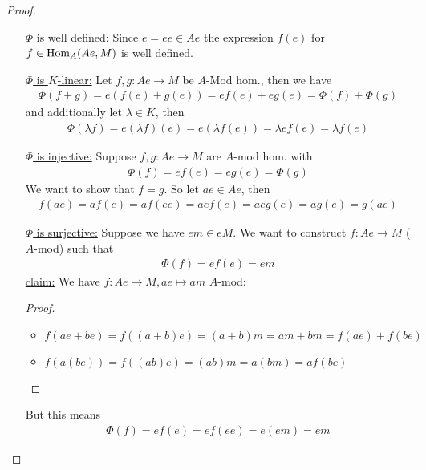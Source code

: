 \documentclass[]{article}
\begin{document}
\begin{proof}
\begin{enumerate}
\begin{itemize}
            \item[\underline{\(\Phi\) is well defined:}] Since \(e = ee \in Ae\) the expression \(f(e)\) for \(f \in \operatorname{Hom}_A(Ae,M)\) is well defined.
            \item[\underline{\(\Phi\) is \(K\)-linear:}] Let \(f,g:Ae \rightarrow M\) be \(A\)-Mod hom., then we have
                \begin{align*}
                    \Phi(f+g)=e(f(e)+g(e))=ef(e)+eg(e) = \Phi(f) + \Phi(g)
                \end{align*}
            and additionally let \(\lambda \in K\), then
            \begin{align*}
                \Phi(\lambda f) = e(\lambda f)(e) = e (\lambda f(e)) = \lambda e f(e) = \lambda f(e)
            \end{align*}
            \item[\underline{\(\Phi\) is injective:}] Suppose \(f,g: Ae \rightarrow M\) are \(A\)-mod hom. with
            \begin{align*}
                \Phi(f)=ef(e)=eg(e)=\Phi(g)
            \end{align*}
            We want to show that \(f=g\). So let \(ae \in Ae\), then
            \begin{align*}
                f(ae)=af(e)=af(ee)=aef(e)=aeg(e)=ag(e)=g(ae)
            \end{align*}
            \item[\underline{\(\Phi\) is surjective:}] Suppose we have \(em \in eM\). We want to construct \(f:Ae \rightarrow M\) (\(A\)-mod) such that
            \begin{align*}
                \Phi(f)=ef(e)=em
            \end{align*}
            \underline{claim:} We have \(f:Ae \rightarrow M, ae \mapsto am\) \(A\)-mod:
            \begin{proof}
                \begin{itemize}
                    \item \(f(ae+be)=f((a+b)e)=(a+b)m=am+bm=f(ae)+f(be)\)
                    \item \(f(a(be))=f((ab)e)=(ab)m =a(bm)=af(be)\)
                \end{itemize}
            \end{proof}
            But this means
            \begin{align*}
                \Phi(f)=ef(e)=ef(ee)=e(em)=em
            \end{align*}
        \end{itemize}

\end{enumerate}
\end{proof}
\end{document}

